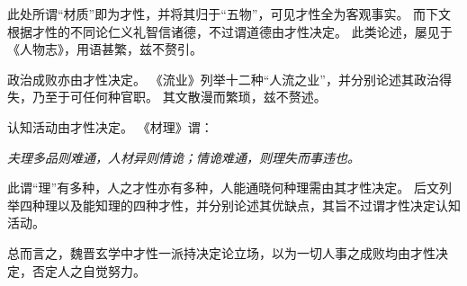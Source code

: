 \documentclass[11pt]{article}
\begin{document}
此处所谓“材质”即为才性，并将其归于“五物”，可见才性全为客观事实。
而下文根据才性的不同论仁义礼智信诸德，不过谓道德由才性决定。
此类论述，屡见于《人物志》，用语甚繁，兹不赘引。

\par

政治成败亦由才性决定。
《流业》列举十二种“人流之业”，并分别论述其政治得失，乃至于可任何种官职。
其文散漫而繁琐，兹不赘述。

\par

认知活动由才性决定。
《材理》谓：

\textit{夫理多品则难通，人材异则情诡；情诡难通，则理失而事违也。}

此谓“理”有多种，人之才性亦有多种，人能通晓何种理需由其才性决定。
后文列举四种理以及能知理的四种才性，并分别论述其优缺点，其旨不过谓才性决定认知活动。

\par

总而言之，魏晋玄学中才性一派持决定论立场，以为一切人事之成败均由才性决定，否定人之自觉努力。
\end{document}
